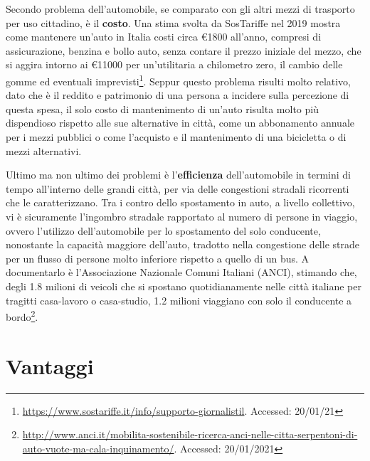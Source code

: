 Secondo problema dell'automobile, se comparato con gli altri mezzi di trasporto per uso cittadino, è il \textbf{costo}. Una stima svolta da SosTariffe nel 2019 mostra come mantenere un'auto in Italia costi circa €1800 all'anno, compresi di assicurazione, benzina e bollo auto, senza contare il prezzo iniziale del mezzo, che si aggira intorno ai €11000 per un'utilitaria a chilometro zero, il cambio delle gomme ed eventuali imprevisti\footnote{\url{https://www.sostariffe.it/info/supporto-giornalistil}. Accessed: 20/01/21}. Seppur questo problema risulti molto relativo, dato che è il reddito e patrimonio di una persona a incidere sulla percezione di questa spesa, il solo costo di mantenimento di un'auto risulta molto più dispendioso rispetto alle sue alternative in città, come un abbonamento annuale per i mezzi pubblici o come l'acquisto e il mantenimento di una bicicletta o di mezzi alternativi.

Ultimo ma non ultimo dei problemi è l'\textbf{efficienza} dell'automobile in termini di tempo all'interno delle grandi città, per via delle congestioni stradali ricorrenti che le caratterizzano. Tra i contro dello spostamento in auto, a livello collettivo, vi è sicuramente l'ingombro stradale rapportato al numero di persone in viaggio, ovvero l'utilizzo dell'automobile per lo spostamento del solo conducente, nonostante la capacità maggiore dell'auto, tradotto nella congestione delle strade per un flusso di persone molto inferiore rispetto a quello di un bus. A documentarlo è l'Associazione Nazionale Comuni Italiani (ANCI), stimando che, degli 1.8 milioni di veicoli che si spostano quotidianamente nelle città italiane per tragitti casa-lavoro o casa-studio, 1.2 milioni viaggiano con solo il conducente a bordo\footnote{\url{http://www.anci.it/mobilita-sostenibile-ricerca-anci-nelle-citta-serpentoni-di-auto-vuote-ma-cala-inquinamento/}. Accessed: 20/01/2021}.

\section{Vantaggi}

